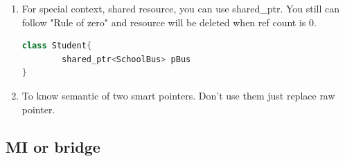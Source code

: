 \documentclass[a4paper,11pt,twoside]{book}
\begin{document}
\begin{itemize}
\begin{enumerate}
		\item For special context, shared resource, you can use shared\_ptr.  You still can follow "Rule of zero" and resource will be deleted when ref count is 0.
\begin{lstlisting}[frame=single, language=c++]
class Student{
		shared_ptr<SchoolBus> pBus
}
\end{lstlisting}
		
		\item To know semantic of two smart pointers. Don't use them just replace raw pointer.
	\end{enumerate}
	
\end{itemize}

\subsection{MI or bridge}
\end{document}
